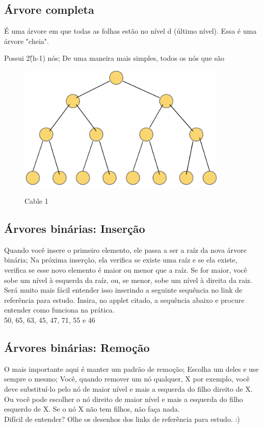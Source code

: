 \documentclass{article}
\begin{document}
\newpage

\subsection{Árvore completa}

É uma árvore em que todas as folhas estão no nível d (último nível). Essa é uma árvore "cheia".

Possui 2\^(h-1) nós; De uma maneira mais simples, todos os nós que são

\begin{figure}[h]
    \center
    \includegraphics[width=10cm]{imagens/arvcompleta.png}
    \label{cable}
    \caption{Cable 1}
\end{figure}



\subsection{Árvores binárias: Inserção}

Quando você insere o primeiro elemento, ele passa a ser a raíz da nova árvore binária; Na próxima
inserção, ela verifica se existe uma raíz e se ela existe, verifica se esse novo
elemento é maior ou menor que a raíz. Se for maior, você sobe um nível à
esquerda da raíz, ou, se menor, sobe um nível à direita da raiz.\\
Será muito mais fácil entender isso inserindo a seguinte sequência no link de
referência para estudo. Insira, no applet citado, a sequência abaixo e procure
entender como funciona na prática.\\
50, 65, 63, 45, 47, 71, 55 e 46

\subsection{Árvores binárias: Remoção}

O mais importante aqui é manter um padrão de remoção; Escolha um deles e use
sempre o mesmo; Você, quando remover um nó qualquer, X por exemplo, você deve substituí-lo pelo nó de maior nível e mais a esquerda do filho direito de X. Ou você pode escolher o nó direito de maior nível e mais a esquerda do filho esquerdo de X. Se o nó X não tem filhos, não faça nada.\\
Difícil de entender? Olhe os desenhos dos links de referência para estudo. :)
\end{document}
